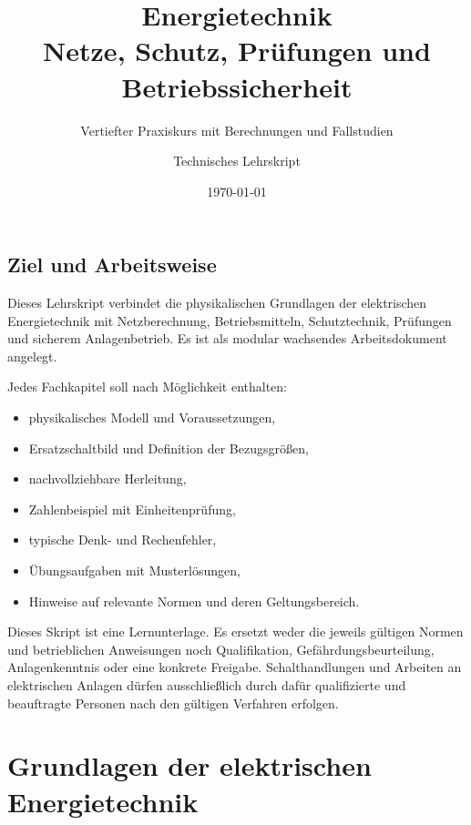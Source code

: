 \documentclass[
    11pt,
    a4paper,
    oneside,
    open=any,
    headings=normal
]{scrbook}
\title{\Huge Energietechnik\\[0.5em]
  \Large Netze, Schutz, Prüfungen und Betriebssicherheit}
\subtitle{Vertiefter Praxiskurs mit Berechnungen und Fallstudien}
\author{Technisches Lehrskript}
\date{\today}
\begin{document}
\frontmatter
\maketitle


\chapter*{Ziel und Arbeitsweise}
Dieses Lehrskript verbindet die physikalischen Grundlagen der elektrischen
Energietechnik mit Netzberechnung, Betriebsmitteln, Schutztechnik, Prüfungen
und sicherem Anlagenbetrieb. Es ist als modular wachsendes Arbeitsdokument
angelegt.

Jedes Fachkapitel soll nach Möglichkeit enthalten:
\begin{itemize}
  \item physikalisches Modell und Voraussetzungen,
  \item Ersatzschaltbild und Definition der Bezugsgrößen,
  \item nachvollziehbare Herleitung,
  \item Zahlenbeispiel mit Einheitenprüfung,
  \item typische Denk- und Rechenfehler,
  \item Übungsaufgaben mit Musterlösungen,
  \item Hinweise auf relevante Normen und deren Geltungsbereich.
\end{itemize}

\begin{sicherheitshinweis}
Dieses Skript ist eine Lernunterlage. Es ersetzt weder die jeweils gültigen
Normen und betrieblichen Anweisungen noch Qualifikation, Gefährdungsbeurteilung,
Anlagenkenntnis oder eine konkrete Freigabe. Schalthandlungen und Arbeiten an
elektrischen Anlagen dürfen ausschließlich durch dafür qualifizierte und
beauftragte Personen nach den gültigen Verfahren erfolgen.
\end{sicherheitshinweis}

\tableofcontents

\mainmatter

\part{Grundlagen der elektrischen Energietechnik}



\end{document}
